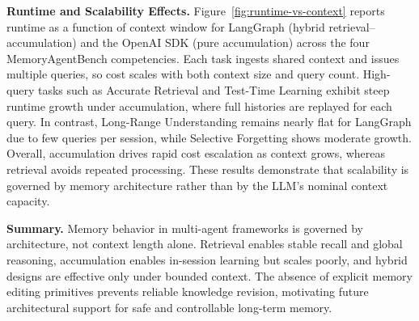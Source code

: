 \smallskip

\noindent\textbf{Runtime and Scalability Effects.}
Figure~\ref{fig:runtime-vs-context} reports runtime as a function of context window for LangGraph (hybrid retrieval–accumulation) and the OpenAI SDK (pure accumulation) across the four MemoryAgentBench competencies. Each task ingests shared context and issues multiple queries, so cost scales with both context size and query count. High-query tasks such as Accurate Retrieval and Test-Time Learning exhibit steep runtime growth under accumulation, where full histories are replayed for each query. In contrast, Long-Range Understanding remains nearly flat for LangGraph due to few queries per session, while Selective Forgetting shows moderate growth. Overall, accumulation drives rapid cost escalation as context grows, whereas retrieval avoids repeated processing. These results demonstrate that scalability is governed by memory architecture rather than by the LLM’s nominal context capacity.

\smallskip
\noindent\textbf{Summary.}
Memory behavior in multi-agent frameworks is governed by architecture, not context length alone. Retrieval enables stable recall and global reasoning, accumulation enables in-session learning but scales poorly, and hybrid designs are effective only under bounded context. The absence of explicit memory editing primitives prevents reliable knowledge revision, motivating future architectural support for safe and controllable long-term memory.



%